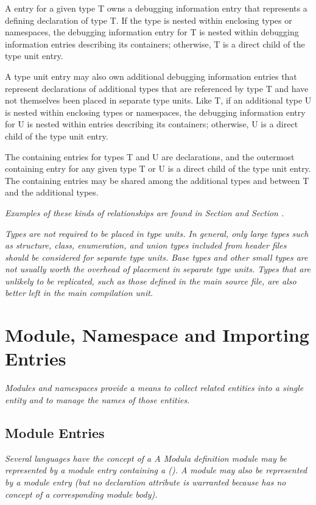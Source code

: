 A  entry for a given type T owns a debugging
information entry that represents a defining declaration
of type T. If the type is nested within enclosing types or
namespaces, the debugging information entry for T is nested
within debugging information entries describing its containers;
otherwise, T is a direct child of the type unit entry.

A type unit entry may also own additional debugging information
entries that represent declarations of additional types that
are referenced by type T and have not themselves been placed in
separate type units. Like T, if an additional type U is nested
within enclosing types or namespaces, the debugging information
entry for U is nested within entries describing its containers;
otherwise, U is a direct child of the type unit entry.

The containing entries for types T and U are declarations,
and the outermost containing entry for any given type T or
U is a direct child of the type unit entry. The containing
entries may be shared among the additional types and between
T and the additional types.

\textit{Examples of these kinds of relationships are found in
Section  and
Section .}

\textit{Types are not required to be placed in type units. In general,
only large types such as structure, class, enumeration, and
union types included from header files should be considered
for separate type units. Base types and other small types
are not usually worth the overhead of placement in separate
type units. Types that are unlikely to be replicated, such
as those defined in the main source file, are also better
left in the main compilation unit.}

\section{Module, Namespace and Importing Entries}
\textit{Modules and namespaces provide a means to collect related
entities into a single entity and to manage the names of
those entities.}

\subsection{Module Entries}
\label{chap:moduleentries}
\textit{Several languages have the concept of a 
A Modula definition module 
may be represented by a module
entry containing a 
(\DWATdeclaration). A
 module 
may also be represented by a module entry
(but no declaration attribute is warranted because 
has no concept of a corresponding module body).}


